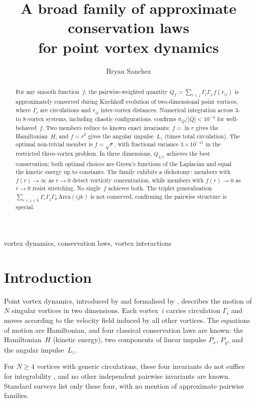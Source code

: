 \documentclass[rapids]{jfm}
\title{A broad family of approximate conservation laws\\ for point vortex dynamics}
\author{Bryan Sanchez\corresp{Email address for correspondence: bryansanchez@proton.me}}
\affiliation{\aff{1}Independent researcher}
\begin{document}
\maketitle

\begin{abstract}
For any smooth function~$f$, the pairwise-weighted quantity $Q_f = \sum_{i<j} \Gamma_i \Gamma_j \, f(r_{ij})$ is approximately conserved during Kirchhoff evolution of two-dimensional point vortices, where $\Gamma_i$ are circulations and $r_{ij}$ inter-vortex distances. Numerical integration across 3- to 8-vortex systems, including chaotic configurations, confirms $\sigma_Q/|\bar{Q}| < 10^{-4}$ for well-behaved~$f$. Two members reduce to known exact invariants: $f = \ln r$ gives the Hamiltonian~$H$, and $f = r^2$ gives the angular impulse~$L_z$ (times total circulation). The optimal non-trivial member is $f = \sqrt{r}$, with fractional variance $3 \times 10^{-11}$ in the restricted three-vortex problem. In three dimensions, $Q_{1/r}$ achieves the best conservation; both optimal choices are Green's functions of the Laplacian and equal the kinetic energy up to constants. The family exhibits a dichotomy: members with $f(r) \to \infty$ as $r \to 0$ detect vorticity concentration, while members with $f(r) \to 0$ as $r \to 0$ resist stretching. No single~$f$ achieves both. The triplet generalisation $\sum_{i<j<k} \Gamma_i \Gamma_j \Gamma_k \,\mathrm{Area}(ijk)$ is not conserved, confirming the pairwise structure is special.
\end{abstract}

\begin{keywords}
vortex dynamics, conservation laws, vortex interactions
\end{keywords}

\section{Introduction}

Point vortex dynamics, introduced by \citet{helmholtz1858} and formalised by \citet{kirchhoff1876}, describes the motion of $N$ singular vortices in two dimensions. Each vortex~$i$ carries circulation $\Gamma_i$ and moves according to the velocity field induced by all other vortices. The equations of motion are Hamiltonian, and four classical conservation laws are known: the Hamiltonian~$H$ (kinetic energy), two components of linear impulse $P_x$, $P_y$, and the angular impulse~$L_z$.

For $N \geq 4$ vortices with generic circulations, these four invariants do not suffice for integrability \citep{newton2001, modin2021}, and no other independent pairwise invariants are known. Standard surveys \citep{aref1983, saffman1992, newton2001, aref2007, newton2014} list only these four, with no mention of approximate pairwise families.
\end{document}
